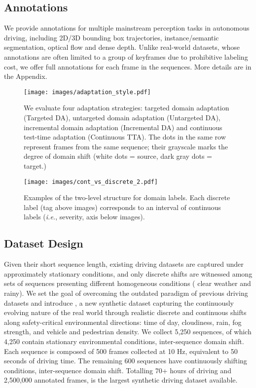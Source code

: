 \subsection{Annotations} \label{ssec:annotations}
We provide annotations for multiple mainstream perception tasks in autonomous driving, including 2D/3D bounding box trajectories,
instance/semantic segmentation, optical flow and dense depth.
Unlike real-world datasets, whose annotations are often limited to a group of keyframes due to prohibitive labeling cost, we offer full annotations for each frame in the sequences.
More details are in the Appendix.

\begin{figure*}[t!]
    \centering
    \texttt{[image: images/adaptation\_style.pdf]}
    \caption{We evaluate four adaptation strategies: targeted domain adaptation (Targeted DA), untargeted domain adaptation (Untargeted DA), incremental domain adaptation (Incremental DA) and continuous test-time adaptation (Continuous TTA). The dots in the same row represent frames from the same sequence; their grayscale marks the degree of domain shift (white dots = source, dark gray dots = target.) }
    \label{fig:adaptation_strategies}
\end{figure*}

\begin{figure}[t]
    \centering
    \texttt{[image: images/cont\_vs\_discrete\_2.pdf]}
    \vspace{-2em}
    \caption{Examples of the two-level structure for domain labels. Each discrete label (tag above images) corresponds to an interval of continuous labels (\textit{i.e.}, severity, axis below images). }
    \label{fig:cont_vs_}
    \vspace{-1em}
\end{figure}

\subsection{Dataset Design} \label{ssec:dataset_design}
Given their short sequence length, existing driving datasets are captured under approximately stationary conditions, and only discrete shifts are witnessed among sets of sequences presenting different homogeneous conditions (\eg{} clear weather and rainy).
We set the goal of overcoming the outdated paradigm of previous driving datasets and introduce \thedataset{}, a new synthetic dataset capturing the continuously evolving nature of the real world through realistic discrete and continuous shifts along safety-critical environmental directions: time of day, cloudiness, rain, fog strength, and vehicle and pedestrian density.
We collect 5,250 sequences, of which 4,250 contain stationary 
environmental conditions, \ie{} inter-sequence domain shift. Each sequence is composed of 500 frames collected at 10 Hz, equivalent to 50 seconds of driving time. The remaining 600 sequences have continuously shifting conditions, \ie{} inter-sequence domain shift. 
Totalling 70+ hours of driving and 2,500,000 annotated frames, \thedataset{} is the largest synthetic driving dataset available.

